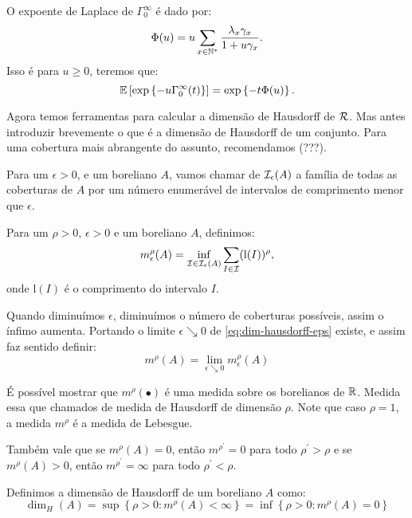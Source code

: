 \begin{proposicao}
  O expoente de Laplace de $\Gamma^\infty_0$ é dado por:
  \begin{displaymath}
    \Phi(u) = u \sum_{x \in {\mathbb{N^*}}} \frac{\lambda_x \gamma_x}{1 + u\gamma_x}.
  \end{displaymath}
  Isso é para $u \geq 0$, teremos que:
  \begin{displaymath}
    {\mathbb{E}} \left[
      \exp \left\{
        -u \Gamma^\infty_0 (t)
      \right\}
    \right] = 
    \exp\left\{
      -t \Phi(u)
    \right\}.
  \end{displaymath}
\end{proposicao}


Agora temos ferramentas para calcular a dimensão de Hausdorff de
${\mathcal{R}}$. Mas antes introduzir brevemente o que é a dimensão de Hausdorff
de um conjunto. Para uma cobertura mais abrangente do assunto,
recomendamos (???).

Para um $\epsilon > 0$, e um boreliano $A$, vamos chamar de
${\mathcal{I}}_\epsilon(A)$ a família de todas as coberturas de $A$ por um número
enumerável de intervalos de comprimento menor que $\epsilon$.


Para um $\rho > 0$, $\epsilon > 0$ e um boreliano $A$, definimos:
\begin{equation}
  \label{eq:dim-hausdorff-eps}
  m^\rho_\epsilon(A) = \inf_{{\mathcal{I}} \in {\mathcal{I}}_\epsilon(A)} 
  \sum_{I \in {\mathcal{I}}} (\mathrm{l}(I))^\rho, 
\end{equation}
onde  $\mathrm{l}(I)$ é o comprimento do intervalo $I$.

Quando diminuímos $\epsilon$, diminuímos o número de coberturas
possíveis, assim o ínfimo aumenta. Portando o limite $\epsilon
\searrow 0$ de \eqref{eq:dim-hausdorff-eps} existe, e assim faz sentido
definir:
\begin{equation}
  \label{eq:dim-hausdorf}
  m^\rho(A) = \lim_{\epsilon \searrow 0} m^\rho_\epsilon (A)
\end{equation}

É possível mostrar que $m^\rho(\bullet)$ é uma medida sobre os
borelianos de ${\mathbb{R}}$. Medida essa que chamados de medida de Hausdorff de
dimensão $\rho$.  Note que caso $\rho = 1$, a medida $m^\rho$ é a
medida de Lebesgue.

Também vale que se $m^\rho(A) = 0$, então $m^{\rho^\prime} = 0$ para
todo $\rho^\prime > \rho$ e se $m^\rho(A) > 0$, então $m^{\rho^\prime}
= \infty$ para todo $\rho^\prime < \rho$.

\begin{definicao}
  Definimos a dimensão de Hausdorff de um boreliano $A$ como:
  \begin{displaymath}
    \dim_H(A) = \sup \left\{ \rho > 0 : m^\rho(A) < \infty \right\}
    = \inf \left\{ \rho > 0: m^\rho(A) = 0 \right\}
  \end{displaymath}
\end{definicao}

